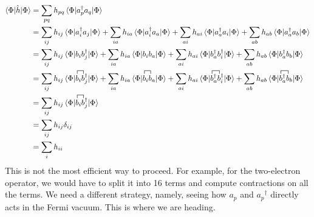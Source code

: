 \documentclass{article}
\newcommand{\fctr}{\contraction}
\newcommand{\dg}{\ensuremath{^\dagger} }
\begin{document}
\begin{align*}
\braket{\Phi | \hat{h} |\Phi} &= \sum_{pq} h_{pq} \braket{\Phi |a_p\dg a_q |\Phi} \\
&= \sum_{ij} h_{ij} \braket{\Phi |a_i\dg a_j |\Phi} +  \sum_{ia} h_{ia} \braket{\Phi |a_i\dg a_a |\Phi} +  \sum_{ai} h_{ai} \braket{\Phi |a_a\dg a_i |\Phi} +  \sum_{ab} h_{ab} \braket{\Phi |a_a\dg a_b |\Phi} \\
&= \sum_{ij} h_{ij} \braket{\Phi |b_i b_j\dg |\Phi} +  \sum_{ia} h_{ia} \braket{\Phi |b_i b_a |\Phi} +  \sum_{ai} h_{ai} \braket{\Phi |b_a\dg b_i\dg |\Phi} +  \sum_{ab} h_{ab} \braket{\Phi |b_a\dg b_b |\Phi} \\
&=  \sum_{ij} h_{ij} \braket{\Phi | \fctr{}{b}{{}_i}{b} b_i b_j\dg |\Phi} +  \sum_{ia} h_{ia} \braket{\Phi | \fctr{}{b}{{}_i}{b} b_i b_a |\Phi} +  \sum_{ai} h_{ai} \braket{\Phi | \fctr{}{b}{{}_a}{b}b_a\dg b_i\dg |\Phi} +  \sum_{ab} h_{ab} \braket{\Phi | \fctr{}{b}{{}_a}{b} b_a\dg b_b |\Phi} \\
&=  \sum_{ij} h_{ij} \braket{\Phi | \fctr{}{b}{{}_i}{b} b_i b_j\dg |\Phi}  \\
&= \sum_{ij} h_{ij} \delta_{ij}  \\
&= \sum_{i} h_{ii} \\
\end{align*}
This is not the most efficient way to proceed.
For example, for the two-electron operator, we would have to split it into 16 terms and compute contractions on all the terms. 
We need a different strategy, namely, seeing how $a_p$ and $a_p\dg$ directly acts in the Fermi vacuum.
This is where we are heading.


\end{document}
